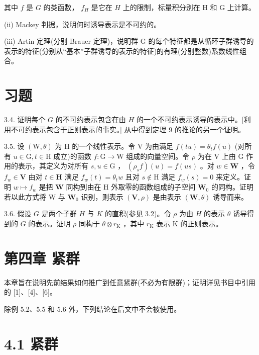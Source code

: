 \documentclass[10pt]{article}
\begin{document}
其中 \(f\) 是 \(G\) 的类函数， \({f}_{H}\) 是它在 \(H\) 上的限制，标量积分别在 \(\mathrm{H}\) 和 \(\mathrm{G}\) 上计算。

(ii) Mackey 判据，说明何时诱导表示是不可约的。

(iii) Artin 定理(分别 Brauer 定理)，说明群 G 的每个特征都是从循环子群诱导的表示的特征(分别从“基本”子群诱导的表示的特征)的有理(分别整数)系数线性组合。

\section*{习题}

3.4. 证明每个 \(G\) 的不可约表示包含在由 \(H\) 的一个不可约表示诱导的表示中。[利用不可约表示包含于正则表示的事实。] 从中得到定理 9 的推论的另一个证明。

3.5. 设 \(\left( {\mathrm{W},\theta }\right)\) 为 \(\mathrm{H}\) 的一个线性表示。令 \(\mathrm{V}\) 为由满足 \(f\left( {tu}\right)  = {\theta }_{t}f\left( u\right)\) (对所有 \(u \in  \mathrm{G},t \in  \mathrm{H}\) 成立)的函数 \(f : \mathrm{G} \rightarrow  \mathrm{W}\) 组成的向量空间。令 \(\rho\) 为在 \(\mathrm{V}\) 上由 \(\mathrm{G}\) 作用的表示，其定义为对所有 \(s,u \in  \mathrm{G}\) ， \(\left( {{\rho }_{s}f}\right) \left( u\right)  = f\left( {us}\right)\) 。对 \(w \in  \mathbf{W}\) ，令 \({f}_{w} \in  \mathbf{V}\) 由对 \(t \in  \mathbf{H}\) 满足 \({f}_{w}\left( t\right)  = {\theta }_{t}w\) 且对 \(s \notin  \mathrm{H}\) 满足 \({f}_{w}\left( s\right)  = 0\) 来定义。证明 \(w \mapsto  {f}_{w}\) 是把 \(\mathbf{W}\) 同构到由在 H 外取零的函数组成的子空间 \({\mathbf{W}}_{0}\) 的同构。证明若以此方式将 W 与 \({\mathbf{W}}_{0}\) 识别，则表示 \(\left( {\mathbf{V},\rho }\right)\) 是由表示 \(\left( {\mathbf{W},\theta }\right)\) 诱导而来。

3.6. 假设 \(G\) 是两个子群 \(H\) 与 \(K\) 的直积(参见 3.2)。令 \(\rho\) 为由 \(H\) 的表示 \(\theta\) 诱导得到的 \(G\) 的表示。证明 \(\rho\) 同构于 \(\theta  \otimes  {r}_{\mathrm{K}}\) ，其中 \({r}_{\mathrm{K}}\) 表示 \(\mathrm{K}\) 的正则表示。

\section*{第四章 紧群}

本章旨在说明先前结果如何推广到任意紧群(不必为有限群)；证明详见书目中引用的 [1]、[4]、[6]。

除例 5.2、5.5 和 5.6 外，下列结论在后文中不会被使用。

\section*{4.1 紧群}
\end{document}
